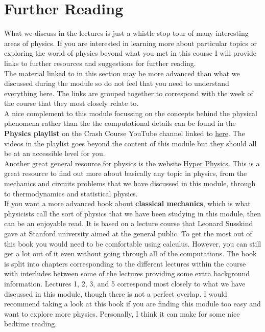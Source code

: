 \documentclass[a4paper,12pt]{book}
\begin{document}
\chapter{Further Reading}
What we discuss in the lectures is just a whistle stop tour of many interesting areas of physics. If you are interested in learning more about particular topics or exploring the world of physics beyond what you met in this course I will provide links to further resources and suggestions for further reading.\\

The material linked to in this section may be more advanced than what we discussed during the module so do not feel that you need to understand everything here. The links are grouped together to correspond with the week of the course that they most closely relate to.\\

A nice complement to this module focussing on the concepts behind the physical phenomena rather than the the computational details can be found in the \textbf{Physics playlist} on the Crash Course YouTube channel linked to \href{https://www.youtube.com/playlist?list=PL8dPuuaLjXtN0ge7yDk_UA0ldZJdhwkoV}{here}. The videos in the playlist goes beyond the content of this module but they should all be at an accessible level for you.\\

Another great general resource for physics is the website \href{http://hyperphysics.phy-astr.gsu.edu/hbase/index.html}{Hyper Physics}.  This is a great resource to find  out more about basically any topic in physics, from the mechanics and circuits problems that we have discussed in this module, through to thermodynamics and statistical physics.\\

If you want a more advanced book about \textbf{classical mechanics}, which is what physicists call the sort of physics that we have been studying in this module, then \citep{susskind_classical} can be an enjoyable read. It is based on a lecture course that Leonard Susskind gave at Stanford university aimed at the general public. To get the most out of this book you would need to be comfortable using calculus. However, you can still get a lot out of it even without going through all of the computations.  The book is split into chapters corresponding to the different lectures within the course with interludes between some of the lectures providing some extra background information. Lectures 1, 2, 3, and 5 correspond most closely to what we have discussed in this module, though there is not a perfect overlap. I would recommend taking a look at this book if you are finding this module too easy and want to explore more physics. Personally, I think it can make for some nice bedtime reading.\\
\end{document}
